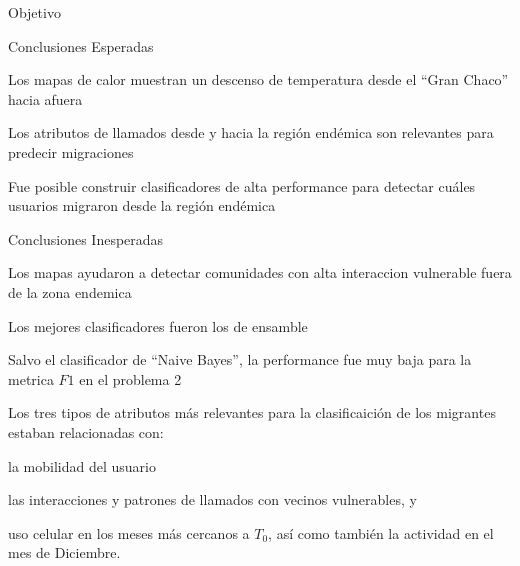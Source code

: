 \documentclass[xcolor=x11names]{beamer}
\begin{document}
\begin{frame}{Objetivo}



\begin{frame}{Conclusiones Esperadas}

	Los mapas de calor muestran un descenso de temperatura desde el ``Gran Chaco'' hacia afuera

	\medskip
	Los atributos de llamados desde y hacia la región endémica son relevantes para predecir migraciones

	\medskip
	Fue posible construir clasificadores de alta performance para detectar cuáles usuarios migraron desde la región endémica

\end{frame}



\begin{frame}{Conclusiones Inesperadas}

	Los mapas ayudaron a detectar comunidades con alta interaccion vulnerable fuera de la zona endemica

	\medskip
	Los mejores clasificadores fueron los de ensamble

	\medskip
	Salvo el clasificador de ``Naive Bayes'', la performance fue muy baja para la metrica $F1$ en el problema 2

	\medskip
	Los tres tipos de atributos más relevantes para la clasificaición de los migrantes estaban relacionadas con:

	\begin{enumerate*}[label={\alph*)},]
		\item la mobilidad del usuario
		\item las interacciones y patrones de llamados con vecinos vulnerables, y
		\item uso celular en los meses más cercanos a $T_0$, así como también la actividad en el mes de Diciembre.
	\end{enumerate*}


\end{frame}
\end{frame}
\end{document}
